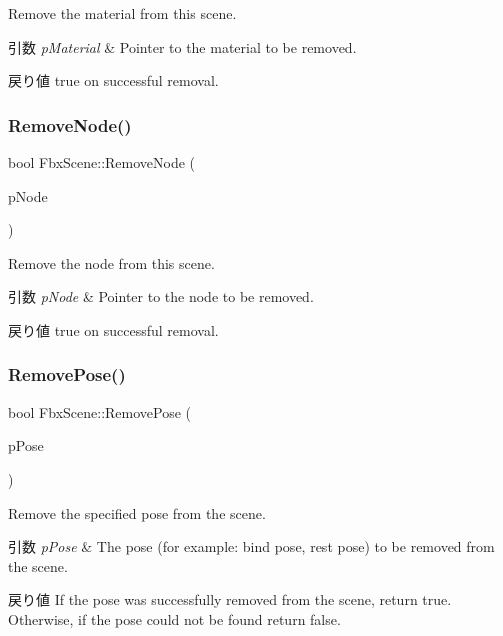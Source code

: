 Remove the material from this scene. 
\begin{DoxyParams}{引数}
{\em p\+Material} & Pointer to the material to be removed. \\
\hline
\end{DoxyParams}
\begin{DoxyReturn}{戻り値}
true on successful removal. 
\end{DoxyReturn}
\mbox{\label{class_fbx_scene_a2e66ac740f8ff46ef58d0fb3dbbe5c65}} 
\subsubsection{\texorpdfstring{Remove\+Node()}{RemoveNode()}}
{\footnotesize\ttfamily bool Fbx\+Scene\+::\+Remove\+Node (\begin{DoxyParamCaption}\item[{\hyperlink{class_fbx_node}{Fbx\+Node} $\ast$}]{p\+Node }\end{DoxyParamCaption})}

Remove the node from this scene. 
\begin{DoxyParams}{引数}
{\em p\+Node} & Pointer to the node to be removed. \\
\hline
\end{DoxyParams}
\begin{DoxyReturn}{戻り値}
true on successful removal. 
\end{DoxyReturn}
\mbox{\label{class_fbx_scene_ad698fe1d231041b3a8ecf5ae3d1e2e86}} 
\subsubsection{\texorpdfstring{Remove\+Pose()}{RemovePose()}\hspace{0.1cm}{\footnotesize\ttfamily [1/2]}}
{\footnotesize\ttfamily bool Fbx\+Scene\+::\+Remove\+Pose (\begin{DoxyParamCaption}\item[{\hyperlink{class_fbx_pose}{Fbx\+Pose} $\ast$}]{p\+Pose }\end{DoxyParamCaption})}

Remove the specified pose from the scene. 
\begin{DoxyParams}{引数}
{\em p\+Pose} & The pose (for example\+: bind pose, rest pose) to be removed from the scene. \\
\hline
\end{DoxyParams}
\begin{DoxyReturn}{戻り値}
If the pose was successfully removed from the scene, return {\ttfamily true}. Otherwise, if the pose could not be found return {\ttfamily false}. 
\end{DoxyReturn}
\mbox{\label{class_fbx_scene_a480cd0951e983a20ae2014a981054db6}} 
